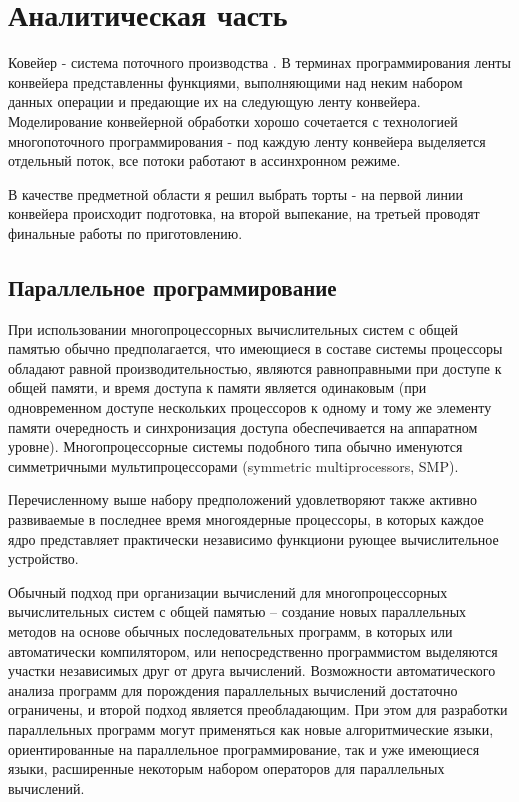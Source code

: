 \chapter{Аналитическая часть}

Ковейер - система поточного производства \cite{mednov}. В терминах программирования ленты конвейера представленны функциями, выполняющими над неким набором данных операции и предающие их на следующую ленту конвейера. Моделирование конвейерной обработки хорошо сочетается с технологией многопоточного программирования - под каждую ленту конвейера выделяется отдельный поток, все потоки работают в ассинхронном режиме.

В качестве предметной области я решил выбрать торты - на первой линии конвейера происходит подготовка, на второй выпекание, на третьей проводят финальные работы по приготовлению.



\section{Параллельное программирование}


При использовании многопроцессорных вычислительных систем с общей памятью обычно предполагается, что имеющиеся в составе системы процессоры обладают равной производительностью, являются равноправными при доступе к общей памяти, и время доступа к памяти является одинаковым (при одновременном доступе нескольких процессоров к одному и тому же элементу памяти очередность и синхронизация доступа обеспечивается на аппаратном уровне). Многопроцессорные системы подобного типа обычно именуются симметричными мультипроцессорами ({\ttfamily symmetric multiprocessors, SMP}).


Перечисленному выше набору предположений удовлетворяют также активно развиваемые в последнее время многоядерные процессоры, в которых каждое ядро представляет практически независимо функциони рующее вычислительное устройство.


Обычный подход при организации вычислений для многопроцессорных вычислительных систем с общей памятью – создание новых параллельных методов на основе обычных последовательных программ, в которых или автоматически компилятором, или непосредственно программистом выделяются участки независимых друг от друга вычислений. Возможности автоматического анализа программ для порождения параллельных вычислений достаточно ограничены, и второй подход является преобладающим. При этом для разработки параллельных программ могут применяться как новые алгоритмические языки, ориентированные на параллельное программирование, так и уже имеющиеся языки, расширенные некоторым набором операторов для параллельных вычислений.



